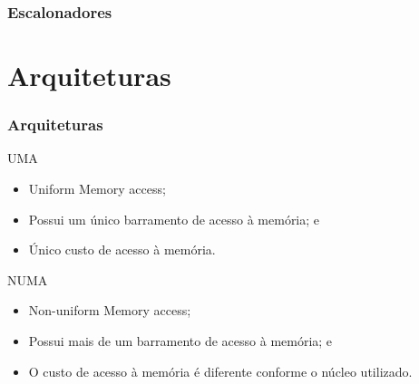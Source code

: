 \documentclass[10pt, pdf,xcolor=pdftex,dvipsnames,table]{beamer}
\begin{document}
\begin{frame} \frametitle{Escalonadores}
\begin{table}[]
    \footnotesize
    \caption{Comparativo entre os escalonadores apresentados}
    \label{tab:compare_ltms}
   \end{table}
\end{frame}

\section{Arquiteturas}
\begin{frame} \frametitle{Arquiteturas}
\begin{block}{UMA}
\begin{itemize}
	\item Uniform Memory access;
	\item Possui um único barramento de acesso à memória; e
	\item Único custo de acesso à memória.
\end{itemize}
\end{block}
\begin{block}{NUMA}
\begin{itemize}
	\item Non-uniform Memory access;
	\item Possui mais de um barramento de acesso à memória; e
	\item O custo de acesso à memória é diferente conforme o núcleo utilizado.
\end{itemize}
\end{block}
\end{frame}
\end{document}
